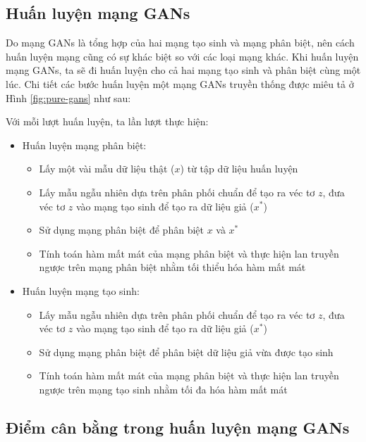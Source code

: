 \subsection{Huấn luyện mạng GANs}

Do mạng GANs là tổng hợp của hai mạng tạo sinh và mạng phân biệt, nên cách huấn luyện mạng cũng có sự khác biệt so với các loại mạng khác. Khi huấn luyện mạng GANs, ta sẽ đi huấn luyện cho cả hai mạng tạo sinh và phân biệt cùng một lúc. Chi tiết các bước huấn luyện một mạng GANs truyền thống được miêu tả ở Hình \ref{fig:pure-gans} như sau:

Với mỗi lượt huấn luyện, ta lần lượt thực hiện:
\begin{itemize}
    \item Huấn luyện mạng phân biệt:
    \begin{itemize}
        \item Lấy một vài mẫu dữ liệu thật ($x$) từ tập dữ liệu huấn luyện
        \item Lấy mẫu ngẫu nhiên dựa trên phân phối chuẩn để tạo ra véc tơ $z$, đưa véc tơ $z$ vào mạng tạo sinh để tạo ra dữ liệu giả ($x^*$)
        \item Sử dụng mạng phân biệt để phân biệt $x$ và $x^*$
        \item Tính toán hàm mất mát của mạng phân biệt và thực hiện lan truyền ngược trên mạng phân biệt nhằm tối thiểu hóa hàm mất mát
    \end{itemize}

    \item Huấn luyện mạng tạo sinh:
    \begin{itemize}
        \item Lấy mẫu ngẫu nhiên dựa trên phân phối chuẩn để tạo ra véc tơ $z$, đưa véc tơ $z$ vào mạng tạo sinh để tạo ra dữ liệu giả ($x^*$)
        \item Sử dụng mạng phân biệt để phân biệt dữ liệu giả vừa được tạo sinh
        \item Tính toán hàm mất mát của mạng phân biệt và thực hiện lan truyền ngược trên mạng tạo sinh nhằm tối đa hóa hàm mất mát
    \end{itemize}
\end{itemize}

\subsection{Điểm cân bằng trong huấn luyện mạng GANs}

